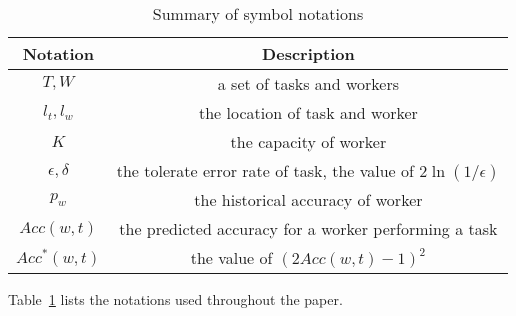 \begin{table}[t]
	\centering
	\caption{Summary of symbol notations}
	\label{table:notations}
	\begin{tabular}{|c|c|}
		\hline
		Notation & Description \\
		\hline
		$T, W$ & a set of tasks and workers \\
		\hline
		$l_t, l_w$ & the location of task and worker \\
		\hline
		$K$ & the capacity of worker \\
		\hline
		$\epsilon,\delta$ & the tolerate error rate of task, the value of $2\ln(1/\epsilon)$ \\
		\hline
		$p_w$ & the historical accuracy of worker \\
		\hline
		$Acc(w,t)$ & the predicted accuracy for a worker performing a task\\ 
		\hline
		$Acc^*(w,t)$ & the value of $(2Acc(w,t) -1)^2$ \\
		\hline
	\end{tabular}
\end{table}

Table~\ref{table:notations} lists the notations used throughout the paper.